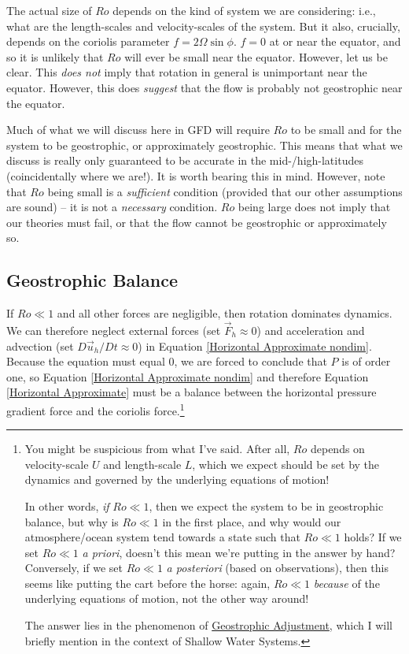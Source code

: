 The actual size of \(Ro\) depends on the kind of system we are considering: i.e., what are the length-scales and velocity-scales of the system. But it also, crucially, depends on the coriolis parameter \(f=2\Omega\sin\phi\). \(f=0\) at or near the equator, and so it is unlikely that \(Ro\) will ever be small near the equator. However, let us be clear. This \textit{does not} imply that rotation in general is unimportant near the equator. However, this does \textit{suggest} that the flow is probably not geostrophic near the equator.

Much of what we will discuss here in GFD will require \(Ro\) to be small and for the system to be geostrophic, or approximately geostrophic. This means that what we discuss is really only guaranteed to be accurate in the mid-/high-latitudes (coincidentally where we are!). It is worth bearing this in mind. However, note that \(Ro\) being small is a \textit{sufficient} condition (provided that our other assumptions are sound) – it is not a \textit{necessary} condition. \(Ro\) being large does not imply that our theories must fail, or that the flow cannot be geostrophic or approximately so.

\subsection{Geostrophic Balance}

If \(Ro\ll 1\) and all other forces are negligible, then rotation dominates dynamics. We can therefore neglect external forces (set \(\vec{F}_h\approx0\)) and acceleration and advection (set \(D\vec{u}_h/Dt\approx0\)) in Equation \ref{Horizontal Approximate nondim}. Because the equation must equal \(0\), we are forced to conclude that \(P\) is of order one, so Equation \ref{Horizontal Approximate nondim} and therefore Equation \ref{Horizontal Approximate} must be a balance between the horizontal pressure gradient force and the coriolis force.\footnote{
    You might be suspicious from what I've said. After all, \(Ro\) depends on velocity-scale \(U\) and length-scale \(L\), which we expect should be set by the dynamics and governed by the underlying equations of motion!

    In other words, \textit{if} \(Ro\ll 1\), then we expect the system to be in geostrophic balance, but why is \(Ro\ll 1\) in the first place, and why would our atmosphere/ocean system tend towards a state such that \(Ro\ll 1\) holds? If we set \(Ro\ll 1\) \textit{a priori}, doesn't this mean we're putting in the answer by hand? Conversely, if we set \(Ro\ll 1\) \textit{a posteriori} (based on observations), then this seems like putting the cart before the horse: again, \(Ro\ll 1\) \textit{because} of the underlying equations of motion, not the other way around!

    The answer lies in the phenomenon of \hyperref[Geostrophic Adjustment]{Geostrophic Adjustment}, which I will briefly mention in the context of Shallow Water Systems.
} 


